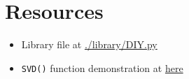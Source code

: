 \section{Resources}
	\begin{itemize}
		\item Library file at \href{https://github.com/PeithonKing/comp_phys_P346/blob/main/library/DIY.py}{.\slash library\slash DIY.py}
		\item \texttt{SVD()} function demonstration at \href{https://github.com/PeithonKing/comp_phys_P346/blob/main/trying_SVD.ipynb}{here}
	\end{itemize}